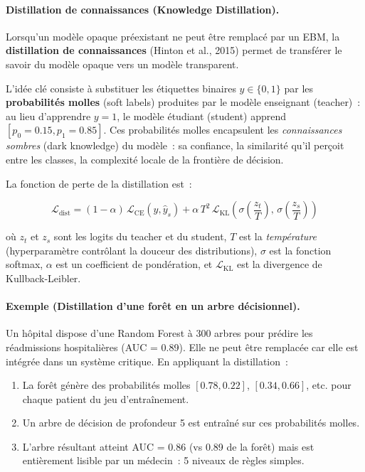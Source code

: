 \paragraph{Distillation de connaissances (Knowledge Distillation).}

Lorsqu'un modèle opaque préexistant ne peut être remplacé par un EBM, la
\textbf{distillation de connaissances} (Hinton et al., 2015) permet de transférer
le savoir du modèle opaque vers un modèle transparent.

L'idée clé consiste à substituer les étiquettes binaires $y \in \{0, 1\}$ par les
\textbf{probabilités molles} (soft labels) produites par le modèle enseignant (teacher)~:
au lieu d'apprendre $y = 1$, le modèle étudiant (student) apprend
$[p_0 = 0.15, p_1 = 0.85]$. Ces probabilités molles encapsulent les
\textit{connaissances sombres} (dark knowledge) du modèle~: sa confiance, la similarité
qu'il perçoit entre les classes, la complexité locale de la frontière de décision.

La fonction de perte de la distillation est~:

\begin{equation}
  \mathcal{L}_{\text{dist}} = (1-\alpha)\,\mathcal{L}_{\text{CE}}(y, \hat{y}_s)
  + \alpha\,T^2\,\mathcal{L}_{\text{KL}}\!\left(\sigma\!\left(\frac{z_t}{T}\right),\, \sigma\!\left(\frac{z_s}{T}\right)\right)
  \label{eq:distillation}
\end{equation}

où $z_t$ et $z_s$ sont les logits du teacher et du student, $T$ est la \textit{température}
(hyperparamètre contrôlant la douceur des distributions), $\sigma$ est la fonction softmax,
$\alpha$ est un coefficient de pondération, et $\mathcal{L}_{\text{KL}}$ est la divergence
de Kullback-Leibler.

\paragraph{Exemple (Distillation d'une forêt en un arbre décisionnel).}
Un hôpital dispose d'une Random Forest à 300 arbres pour prédire les réadmissions
hospitalières (AUC = 0.89). Elle ne peut être remplacée car elle est intégrée dans
un système critique. En appliquant la distillation~:
\begin{enumerate}
  \item La forêt génère des probabilités molles $[0.78, 0.22]$, $[0.34, 0.66]$, etc.
        pour chaque patient du jeu d'entraînement.
  \item Un arbre de décision de profondeur 5 est entraîné sur ces probabilités molles.
  \item L'arbre résultant atteint AUC = 0.86 (vs 0.89 de la forêt) mais est
        entièrement lisible par un médecin~: 5 niveaux de règles simples.
\end{enumerate}

